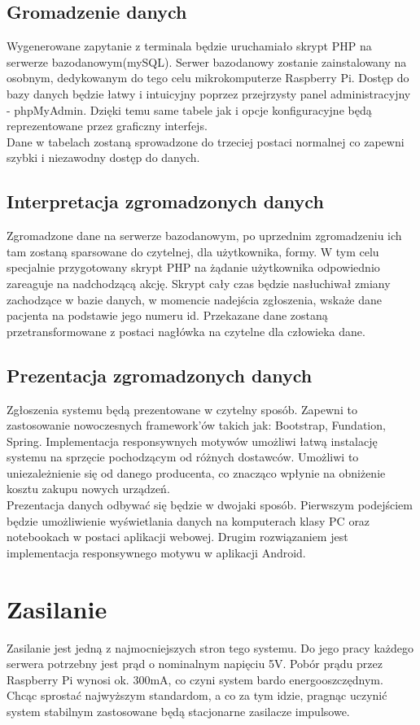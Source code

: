 \documentclass[12pt]{article} %
\begin{document}
\subsection{Gromadzenie danych}
Wygenerowane zapytanie z terminala będzie uruchamiało skrypt PHP na serwerze bazodanowym(mySQL). Serwer bazodanowy zostanie zainstalowany na osobnym, dedykowanym do tego celu mikrokomputerze Raspberry Pi. Dostęp do bazy danych będzie łatwy i intuicyjny poprzez przejrzysty panel administracyjny - phpMyAdmin. Dzięki temu same tabele jak i opcje konfiguracyjne będą reprezentowane przez graficzny interfejs.\\
Dane w tabelach zostaną sprowadzone do trzeciej postaci normalnej co zapewni szybki i niezawodny dostęp do danych. 

\subsection{Interpretacja zgromadzonych danych}
Zgromadzone dane na serwerze bazodanowym, po uprzednim zgromadzeniu ich tam zostaną sparsowane do czytelnej, dla użytkownika, formy. W tym celu specjalnie przygotowany skrypt PHP na żądanie użytkownika odpowiednio zareaguje na nadchodzącą akcję. Skrypt cały czas będzie nasłuchiwał zmiany zachodzące w bazie danych, w momencie nadejścia zgłoszenia, wskaże dane pacjenta na podstawie jego numeru id. Przekazane dane zostaną przetransformowane z postaci nagłówka na czytelne dla człowieka dane.

\subsection{Prezentacja zgromadzonych danych}
Zgłoszenia systemu będą prezentowane w czytelny sposób. Zapewni to zastosowanie nowoczesnych framework'ów takich jak: Bootstrap, Fundation, Spring. Implementacja responsywnych motywów umożliwi łatwą instalację systemu na sprzęcie pochodzącym od różnych dostawców. Umożliwi to uniezależnienie się od danego producenta, co znacząco wpłynie na obniżenie kosztu zakupu nowych urządzeń. 
\\
Prezentacja danych odbywać się będzie w dwojaki sposób. Pierwszym podejściem będzie umożliwienie wyświetlania danych na komputerach klasy PC oraz notebookach w postaci aplikacji webowej. Drugim rozwiązaniem jest implementacja responsywnego motywu w aplikacji Android.

\section{Zasilanie}
Zasilanie jest jedną z najmocniejszych stron tego systemu. Do jego pracy każdego serwera potrzebny jest prąd o nominalnym napięciu 5V. Pobór prądu przez Raspberry Pi wynosi ok. 300mA, co czyni system bardo energooszczędnym. Chcąc sprostać najwyższym standardom, a co za tym idzie, pragnąc uczynić system stabilnym zastosowane będą stacjonarne zasilacze impulsowe.
\end{document}
